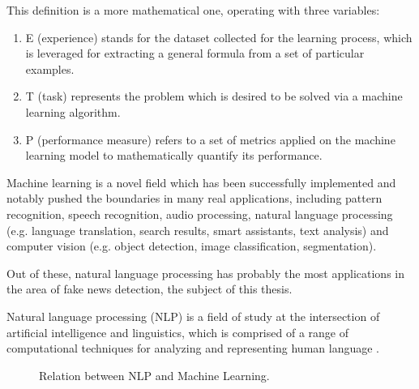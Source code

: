 This definition is a more mathematical one, operating with three variables:
\begin{enumerate}
  \item E (experience) stands for the dataset collected for the learning process, which is leveraged for extracting a general formula from a set of particular examples.
  \item T (task) represents the problem which is desired to be solved via a machine learning algorithm.
  \item P (performance measure) refers to a set of metrics applied on the machine learning model to mathematically quantify its performance.    
\end{enumerate}

Machine learning is a novel field which has been successfully implemented and notably pushed the boundaries in many real applications, including pattern recognition, speech recognition, audio processing, natural language processing (e.g. language translation, search results, smart assistants, text analysis) and computer vision (e.g. object detection, image classification, segmentation).

Out of these, natural language processing has probably the most applications in the area of fake news detection, the subject of this thesis.

\begin{definition}
  Natural language processing (NLP) is a field of study at the intersection of artificial intelligence and linguistics, which is comprised of a range of computational techniques for analyzing and representing human language \cite{a8}.
\end{definition}


\begin{figure}[H]
  \centering
  \caption{Relation between NLP and Machine Learning.}
\end{figure}

